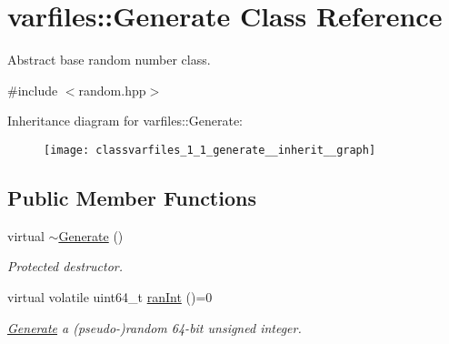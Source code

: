 \hypertarget{classvarfiles_1_1_generate}{}\section{varfiles\+:\+:Generate Class Reference}
\label{classvarfiles_1_1_generate}


Abstract base random number class.  




{\ttfamily \#include $<$random.\+hpp$>$}



Inheritance diagram for varfiles\+:\+:Generate\+:\nopagebreak
\begin{figure}[H]
\begin{center}
\leavevmode
\texttt{[image: classvarfiles\_1\_1\_generate\_\_inherit\_\_graph]}
\end{center}
\end{figure}
\subsection*{Public Member Functions}
\begin{DoxyCompactItemize}
\item 
\mbox{\label{classvarfiles_1_1_generate_a9eb23e1f95562da88f6e607277eb1714}} 
virtual \hyperlink{classvarfiles_1_1_generate_a9eb23e1f95562da88f6e607277eb1714}{$\sim$\+Generate} ()
\begin{DoxyCompactList}\small\item\em Protected destructor. \end{DoxyCompactList}\item 
virtual volatile uint64\+\_\+t \hyperlink{classvarfiles_1_1_generate_a8cac7a586f21a0def82cd68c379f9f86}{ran\+Int} ()=0
\begin{DoxyCompactList}\small\item\em \hyperlink{classvarfiles_1_1_generate}{Generate} a (pseudo-\/)random 64-\/bit unsigned integer. \end{DoxyCompactList}\end{DoxyCompactItemize}
